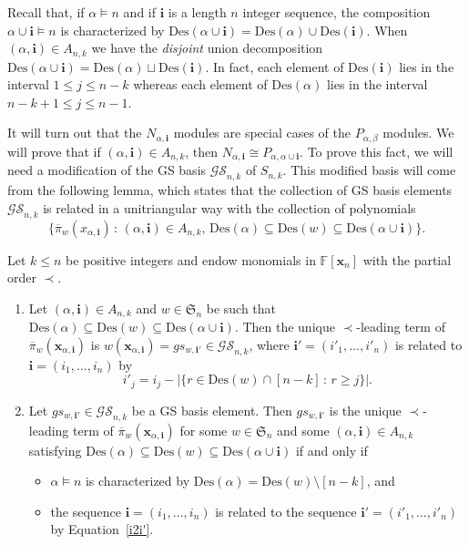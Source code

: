 \documentclass[ALCO,ThmDefs,published]{cedram}
\newcommand{\symm}{{\mathfrak{S}}}
\newcommand{\xx}{{\mathbf {x}}}
\newcommand{\FF}{{\mathbb{F}}}
\theoremstyle{plain}
\newcommand{\Des}{{\mathrm {Des}}}
\newcommand{\symm}{{\mathfrak{S}}}
\newcommand{\FF}{{\mathbb{F}}}
\newcommand{\GS}{{\mathcal{GS}}}
\newcommand{\xx}{{\mathbf {x}}}
\newcommand{\ii}{{\mathbf{i}}}
\newcommand{\pib}{\overline{\pi}}
\begin{document}
Recall that, if $\alpha \models n$ and if $\ii$ is a length $n$ integer sequence, the composition
$\alpha \cup \ii \models n$ is characterized by $\Des(\alpha \cup \ii ) = \Des(\alpha) \cup \Des(\ii)$.
When $(\alpha, \ii) \in A_{n,k}$ we have the \emph{disjoint} union decomposition
$\Des(\alpha \cup \ii) = \Des(\alpha) \sqcup \Des(\ii)$.  In fact, each element of $\Des(\ii)$ lies in the interval
$1 \leq j \leq n-k$ whereas each element of $\Des(\alpha)$ lies in the interval $n-k+1 \leq j \leq n-1$.

It will turn out that the $N_{\alpha,\ii}$ modules are special cases of the $P_{\alpha,\beta}$ modules.
We will prove that if $(\alpha, \ii) \in A_{n,k}$, then 
$N_{\alpha,\ii} \cong P_{\alpha,\alpha \cup \ii}$.
To prove this fact, we will need a modification of the GS basis $\GS_{n,k}$ of $S_{n,k}$.
This modified basis will come from the following lemma, which 
states that the collection of GS basis elements $\GS_{n,k}$
is related in a unitriangular way with the collection of polynomials
\begin{equation*}
\{ \pib_w(x_{\alpha,\ii}) \,:\, 
(\alpha,\ii) \in A_{n,k}, \, \Des(\alpha) \subseteq \Des(w) \subseteq \Des(\alpha \cup \ii) \}.
\end{equation*}

\begin{lemma}
\label{gs-n-lemma}  
Let $k \leq n$ be positive integers and endow monomials in $\FF[\xx_n]$
with the partial order $\prec$.
\begin{enumerate}[label=\textup{(}\roman*\textup{)}]
\item  Let $(\alpha, \ii) \in A_{n,k}$ and $w \in \symm_n$ be such that 
$\Des(\alpha) \subseteq \Des(w) \subseteq \Des(\alpha \cup \ii)$.  
Then the unique $\prec$-leading term of 
$\pib_w(\xx_{\alpha,\ii})$ is $w(\xx_{\alpha,\ii}) = gs_{w,\ii'} \in \GS_{n,k}$, where
$\ii' = (i'_1, \dots, i'_n)$ is related to $\ii = (i_1, \dots, i_n)$ by
\begin{equation}\label{i2i'}
i'_j = i_j - | \{r \in \Des(w)\cap[n-k] \,:\, r \geq j \} |.
\end{equation}
\item Let $gs_{w,\ii'} \in \GS_{n,k}$ be a GS basis element.  
Then $gs_{w,\ii'}$ is the unique $\prec$-leading term of $\pib_w(\xx_{\alpha,\ii})$ 
for some $w\in\symm_n$ and some $(\alpha,\ii) \in A_{n,k}$ satisfying
$\Des(\alpha) \subseteq \Des(w) \subseteq \Des(\alpha \cup \ii)$ if and only if 
\begin{itemize}
\item  $\alpha \models n$ is characterized by $\Des(\alpha) = \Des(w) \setminus [n-k]$, and
\item the sequence $\ii = (i_1, \dots, i_n)$ is related to the sequence $\ii' = (i'_1, \dots, i'_n)$ by Equation~\eqref{i2i'}.
\end{itemize}
\end{enumerate}
\end{lemma}
\end{document}
